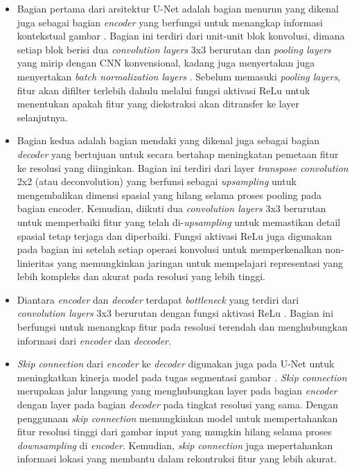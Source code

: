 \begin{itemize}
	\item Bagian pertama dari arsitektur U-Net adalah bagian menurun yang dikenal juga sebagai bagian \textit{encoder} yang berfungsi untuk menangkap informasi kontekstual gambar \cite{azad_medical_2022}. Bagian ini terdiri dari unit-unit blok konvolusi, dimana setiap blok berisi dua \textit{convolution layers} 3x3 berurutan dan \textit{pooling layers} yang mirip dengan CNN konvensional, kadang juga menyertakan juga menyertakan \textit{batch normalization layers} \cite{younisse_fine-tuning_2023}. Sebelum memasuki \textit{pooling layers}, fitur akan difilter terlebih dahulu melalui fungsi aktivasi ReLu untuk menentukan apakah fitur yang diekstraksi akan ditransfer ke layer selanjutnya.
	
	\item Bagian kedua adalah bagian mendaki yang dikenal juga sebagai bagian \textit{decoder} yang bertujuan untuk secara bertahap meningkatan pemetaan fitur ke resolusi yang diinginkan\cite{siddique_u-net_2020}. Bagian ini terdiri dari layer \textit{transpose convolution} 2x2 (atau deconvolution) yang berfunsi sebagai \textit{upsampling} untuk mengembalikan dimensi spasial yang hilang selama proses pooling pada bagian encoder. Kemudian, diikuti dua \textit{convolution layers} 3x3 berurutan untuk memperbaiki fitur yang telah di-\textit{upsampling} untuk memastikan detail spasial tetap terjaga dan diperbaiki\cite{purushothaman_image_2022}. Fungsi aktivasi ReLu juga digunakan pada bagian ini setelah setiap operasi konvolusi untuk memperkenalkan non-linieritas yang memungkinkan jaringan untuk mempelajari representasi yang lebih kompleks dan akurat pada resolusi yang lebih tinggi\cite{huang_fully_2022}.
	
	\item Diantara \textit{encoder} dan \textit{decoder} terdapat \textit{bottleneck} yang terdiri dari \textit{convolution layers} 3x3 berurutan dengan fungsi aktivasi ReLu \cite{azad_medical_2022}. Bagian ini berfungsi untuk menangkap fitur pada resolusi terendah dan menghubungkan informasi dari \textit{encoder} dan \textit{deceoder}.
	
	\item \textit{Skip connection} dari \textit{encoder} ke \textit{decoder} digunakan juga pada U-Net untuk meningkatkan kinerja model pada tugas segmentasi gambar \cite{azad_medical_2022}. \textit{Skip connection}  merupakan jalur langsung yang menghubungkan layer pada bagian \textit{encoder} dengan layer pada bagian \textit{decoder} pada tingkat resolusi yang sama. Dengan penggunaan \textit{skip connection} memungkinkan model untuk mempertahankan fitur resolusi tinggi dari gambar input yang mungkin hilang selama proses \textit{downsampling} di \textit{encoder}. Kemudian,\textit{ skip connection} juga mepertahankan informasi lokasi yang membantu dalam rekontruksi fitur yang lebih akurat\cite{siddique_u-net_2020}.
	

\end{itemize}
